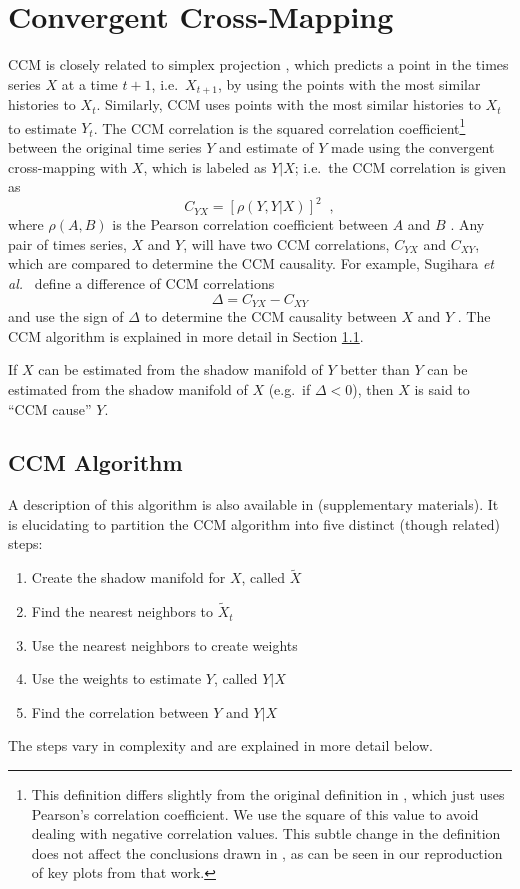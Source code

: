 \documentclass[a4paper,11pt,twocolumn]{article}
\begin{document}
\section{Convergent Cross-Mapping}
CCM is closely related to simplex projection \cite{Sugihara1990,Sugihara1990a}, which predicts a point in the times series $X$ at a time $t+1$, i.e.\ $X_{t+1}$, by using the points with the most similar histories to $X_t$.  Similarly, CCM uses points with the most similar histories to $X_t$ to estimate $Y_t$.  The CCM correlation is the squared correlation coefficient\footnote{This definition differs slightly from the original definition in \cite{Sugihara2012}, which just uses Pearson’s correlation coefficient.  We use the square of this value to avoid dealing with negative correlation values.  This subtle change in the definition does not affect the conclusions drawn in \cite{Sugihara2012}, as can be seen in our reproduction of key plots from that work.} between the original time series $Y$ and estimate of $Y$ made using the convergent cross-mapping with $X$, which is labeled as $Y|X$; i.e.\ the CCM correlation is given as 
$$
C_{YX} = \left[\rho\left(Y,Y|X\right)\right]^2\;\;,
$$
where $\rho(A,B)$ is the Pearson correlation coefficient between $A$ and $B$ \cite{}.  Any pair of times series, $X$ and $Y$, will have two CCM correlations, $C_{YX}$ and $C_{XY}$, which are compared to determine the CCM causality.  For example, Sugihara {\em et al.\ }\cite{Sugihara2012} define a difference of CCM correlations
\begin{equation}
\label{eqn:delta}
\Delta = C_{YX} - C_{XY}
\end{equation}
and use the sign of $\Delta$ to determine the CCM causality between $X$ and $Y$ \cite{Sugihara2012}.  The CCM algorithm is explained in more detail in Section \ref{sec:appA}.

If $X$ can be estimated from the shadow manifold of $Y$ better than $Y$ can be estimated from the shadow manifold of $X$ (e.g.\ if $\Delta < 0$), then $X$ is said to ``CCM cause'' $Y$.

\subsection{CCM Algorithm}
\label{sec:appA}
A description of this algorithm is also available in \cite{Sugihara2012} (supplementary materials).  It is elucidating to partition the CCM algorithm into five distinct (though related) steps:
\begin{enumerate}
\item Create the shadow manifold for $X$, called $\tilde{X}$
\item Find the nearest neighbors to $\tilde{X}_t$
\item Use the nearest neighbors to create weights
\item Use the weights to estimate $Y$, called $Y|X$
\item Find the correlation between $Y$ and $Y|X$ 
\end{enumerate}
The steps vary in complexity and are explained in more detail below.
\end{document}
